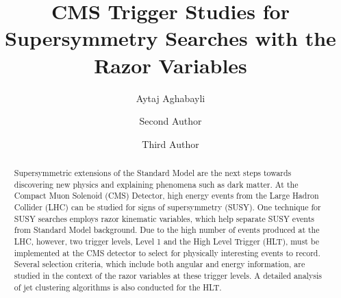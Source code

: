\documentclass[twocolumn,aps,prd,reprint]{revtex4-1}
\begin{document}
\graphicspath{{AytajAghabayli/}}

\title{CMS Trigger Studies for Supersymmetry Searches with the Razor Variables}
\author{Aytaj Aghabayli}
\author{Second Author}
\author{Third Author}

\begin{abstract}
Supersymmetric extensions of the Standard Model are the next steps towards discovering new physics and explaining phenomena such as dark matter. At the Compact Muon Solenoid (CMS) Detector, high energy events from the Large Hadron Collider (LHC) can be studied for signs of supersymmetry (SUSY). One technique for SUSY searches employs razor kinematic variables, which help separate SUSY events from Standard Model background. Due to the high number of events produced at the LHC, however, two trigger levels, Level 1 and the High Level Trigger (HLT), must be implemented at the CMS detector to select for physically interesting events to record. Several selection criteria, which include both angular and energy information, are studied in the context of the razor variables at these trigger levels. A detailed analysis of jet clustering algorithms is also conducted for the HLT.
\end{abstract}
\maketitle
\end{document}
